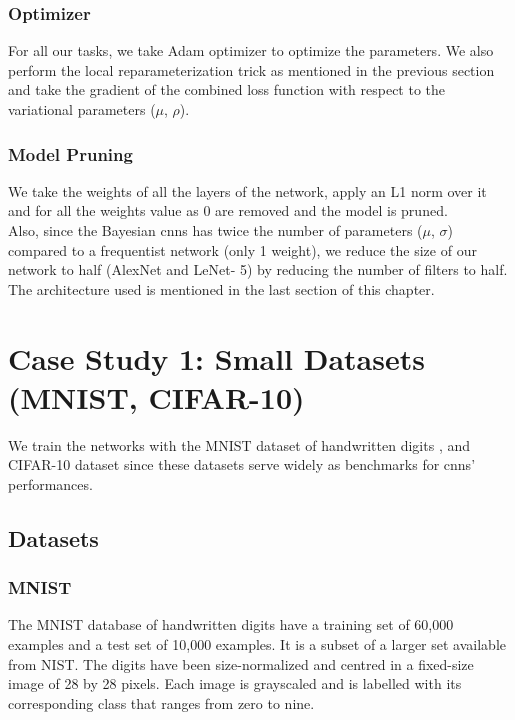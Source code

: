 \subsubsection{Optimizer}

For all our tasks, we take Adam optimizer \cite{KingmaB14} to optimize the parameters. We also perform the local reparameterization trick as mentioned in the previous section and take the gradient of the combined loss function with respect to the variational parameters ($\mu$, $\rho$).

\subsubsection{Model Pruning}

We take the weights of all the layers of the network, apply an L1 norm over it and for all the weights value as 0 are removed and the model is pruned. \\ Also, since the Bayesian \acp{cnn} has twice the number of parameters ($\mu$, $\sigma$) compared to a frequentist network (only 1 weight), we reduce the size of our network to half (AlexNet and LeNet- 5) by reducing the number of filters to half. The architecture used is mentioned in the last section of this chapter.

\section{Case Study 1: Small Datasets (MNIST, CIFAR-10)}

We train the networks with the MNIST dataset of handwritten digits \cite{lecun1998gradient}, and CIFAR-10 dataset \cite{krizhevsky2009learning} since these datasets serve widely as benchmarks for \acp{cnn}' performances. 

\subsection{Datasets}
\newline
\subsubsection{MNIST}
The MNIST database \cite{lecun-mnisthandwrittendigit-2010} of handwritten digits have a training set of 60,000 examples and a test set of 10,000 examples. It is a subset of a larger set available from NIST. The digits have been size-normalized and centred in a fixed-size image of 28 by 28 pixels. Each image is grayscaled and is labelled with its corresponding class that ranges from zero to nine.
\newline

